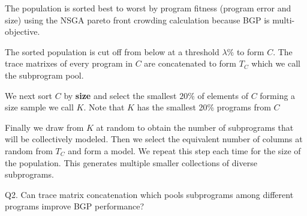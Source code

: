 \begin{inparaenum}
\item The population is sorted best to worst by program fitness (program error and size) using the NSGA pareto front crowding calculation because BGP is multi-objective.

\item The sorted population is cut off from below at a threshold $\lambda \%$ to form $C$.  The trace matrixes of every program in $C$ are concatenated to form $T_C$ which we call the subprogram pool.  

\item We next sort $C$ by \textbf{size} and select the smallest $20\%$ of elements of $C$ forming a size sample we call $K$. Note that $K$ has the smallest 20\% programs from $C$
   
\item Finally we draw from $K$ at random to obtain the number of subprograms that will be collectively modeled. Then we select the equivalent number of columns at random from $T_C$ and form a model. We repeat this step each time for the size of the population.  This generates multiple smaller collections of diverse subprograms. 

\end{inparaenum}

\noindent Q2. Can trace matrix concatenation which pools subprograms among different programs improve BGP performance?


%





